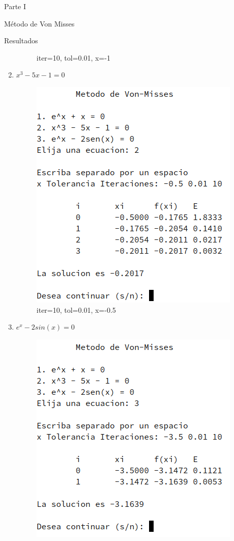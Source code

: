 \documentclass[legalpaper, 12pt]{article}
\def \eqb {\(x^3 - 5x - 1 = 0\)}
\def \eqc {\(e^x - 2sin(x) = 0\)}
\begin{document}
\begin{section}{Parte I}
\begin{subsection}{Método de Von Misses}
\begin{subsubsection}{Resultados}
\begin{enumerate}
\begin{figure}[h]
            \caption{iter=10, tol=0.01, x=-1}
          \end{figure}
          \item \eqb
          \begin{figure}[h]
            \centering
            \includegraphics[scale=0.8]{von2.png}
            \caption{iter=10, tol=0.01, x=-0.5}
          \end{figure}
          \newpage
          \item \eqc
          \begin{figure}[h]
            \centering
            \includegraphics[scale=0.8]{von3.png}

\end{figure}
\end{enumerate}
\end{subsubsection}
\end{subsection}
\end{section}
\end{document}

